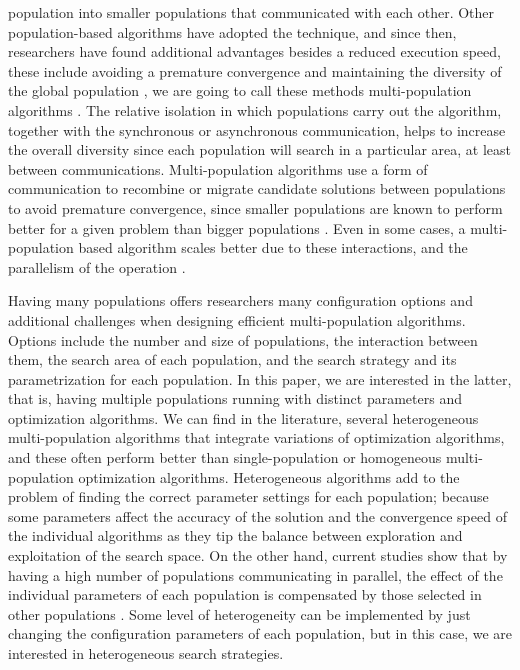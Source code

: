population into smaller populations that communicated with each other. Other
population-based algorithms have adopted the technique, and since then,
researchers have found additional advantages besides a reduced execution speed, 
these include avoiding a premature convergence and maintaining the diversity of the
global population \cite{li2015multi}, we are going to call these methods 
multi-population algorithms \cite{Ma2019}. The relative 
isolation in which populations carry out the algorithm, together with the
synchronous or asynchronous communication, helps to increase the overall
diversity since each population will search in a particular area, at least
between communications. Multi-population algorithms use a form of
communication to recombine or migrate candidate solutions between populations
to avoid premature convergence, since smaller populations are known to perform
better for a given problem than bigger populations
\cite{li2016multi,wu2016differential}. Even in some cases, a multi-population based
algorithm scales better due to these interactions, and the parallelism of the
operation \cite{ALBA20027}. 

Having many populations offers researchers many configuration options and
additional challenges when designing efficient multi-population algorithms.
Options include the number and size of populations, the interaction between
them, the search area of each population, and the search strategy and its
parametrization for each population.  In this paper, we are interested in the
latter, that is, having multiple populations running with distinct parameters
and optimization algorithms. We can find in the literature, several
heterogeneous multi-population algorithms that integrate variations of optimization
algorithms, and these often perform better than single-population or homogeneous
multi-population optimization algorithms\cite{wu2016differential,nseef2016adaptive}.
Heterogeneous algorithms add to
the problem of finding the correct parameter settings for each population;
because some parameters affect the accuracy of the solution and the convergence
speed of the individual algorithms as they tip the balance between exploration
and exploitation of the search space. On the other hand, current studies show
that by having a high number of populations communicating in parallel, the
effect of the individual parameters of each population is compensated by those
selected in other populations \cite{li2016multi,tanabe2013evaluation}. Some
level of heterogeneity can be implemented by just changing the configuration
parameters of each population, but in this case, we are interested in
heterogeneous search strategies.

